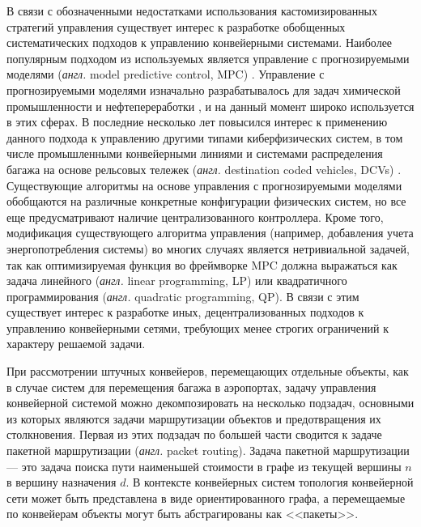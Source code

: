 \documentclass[specification,annotation,times]{itmo-student-thesis}
\theoremstyle{definition}
\begin{document}
В связи с обозначенными недостатками использования кастомизированных стратегий
управления существует интерес к разработке обобщенных систематических подходов к
управлению конвейерными системами. Наиболее популярным подходом из используемых
является управление с прогнозируемыми моделями (\textit{англ.} model predictive
control, MPC) \cite{qin2003survey}. Управление с прогнозируемыми моделями
изначально разрабатывалось для задач химической промышленности и
нефтепереработки \cite{eaton1992model}, и на данный момент широко используется в
этих сферах. В последние несколько лет повысился интерес к применению данного
подхода к управлению другими типами киберфизических систем, в том числе
промышленными конвейерными линиями \cite{cataldo2016dynamic, luo2015energy} и
системами распределения багажа на основе рельсовых тележек (\textit{англ.}
destination coded vehicles, DCVs) \cite{tarau2010model, zeinaly2015integrated}.
Существующие алгоритмы на основе управления с прогнозируемыми моделями
обобщаются на различные конкретные конфигурации физических систем, но все еще
предусматривают наличие централизованного контроллера. Кроме того, модификация
существующего алгоритма управления (например, добавления учета энергопотребления
системы) во многих случаях является нетривиальной задачей, так как
оптимизируемая функция во фреймворке MPC должна выражаться как задача линейного
(\textit{англ.} linear programming, LP) или квадратичного программирования
(\textit{англ.} quadratic programming, QP). В связи с этим существует интерес к
разработке иных, децентрализованных подходов к управлению конвейерными сетями,
требующих менее строгих ограничений к характеру решаемой задачи.

При рассмотрении штучных конвейеров, перемещающих отдельные объекты, как в
случае систем для перемещения багажа в аэропортах, задачу управления конвейерной
системой можно декомпозировать на несколько подзадач, основными из которых являются задачи
маршрутизации объектов и предотвращения их столкновения.
Первая из этих подзадач по большей части сводится к задаче пакетной маршрутизации
(\textit{англ.} packet routing). Задача пакетной маршрутизации --- это задача
поиска пути наименьшей стоимости в графе из текущей вершины $n$ в вершину
назначения $d$. В контексте конвейерных систем топология конвейерной сети может
быть представлена в виде ориентированного графа, а перемещаемые по конвейерам
объекты могут быть абстрагированы как <<пакеты>>. 
\end{document}
